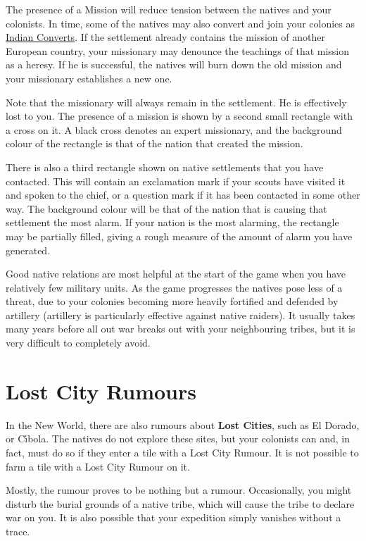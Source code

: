 \documentclass[12pt]{book}
\newcommand{\Concept}[1]{\index{#1}\hypertarget{#1}{\textbf{#1}}}
\begin{document}
The presence of a Mission will reduce tension between the natives and
your colonists. In time, some of the natives may also convert and join
your colonies as \hyperlink{Indian Convert}{Indian Converts}. If the
settlement already contains the mission of another European country,
your missionary may denounce the teachings of that mission as a
heresy. If he is successful, the natives will burn down the old
mission and your missionary establishes a new one.

Note that the missionary will always remain in the settlement. He is
effectively lost to you. The presence of a mission is shown by a
second small rectangle with a cross on it. A black cross denotes an expert
missionary, and the background colour of the rectangle is that of the
nation that created the mission.

There is also a third rectangle shown on native settlements that you
have contacted. This will contain an exclamation mark if your scouts
have visited it and spoken to the chief, or a question mark if it has
been contacted in some other way. The background colour will be that
of the nation that is causing that settlement the most alarm. If your
nation is the most alarming, the rectangle may be partially filled,
giving a rough measure of the amount of alarm you have generated.

Good native relations are most helpful at the start of the game when
you have relatively few military units. As the game progresses the
natives pose less of a threat, due to your colonies becoming more
heavily fortified and defended by artillery (artillery is particularly
effective against native raiders). It usually takes many years before
all out war breaks out with your neighbouring tribes, but it is
very difficult to completely avoid.


\hypertarget{Lost City Rumours}{\section{Lost City Rumours}}

In the New World, there are also rumours about \Concept{Lost Cities},
such as El Dorado, or C{\'\i}bola. The natives do not explore these
sites, but your colonists can and, in fact, must do so if they enter a
tile with a Lost City Rumour. It is not possible to farm a tile with a
Lost City Rumour on it.

Mostly, the rumour proves to be nothing but a rumour. Occasionally,
you might disturb the burial grounds of a native tribe, which will
cause the tribe to declare war on you. It is also possible that your
expedition simply vanishes without a trace.
\end{document}
